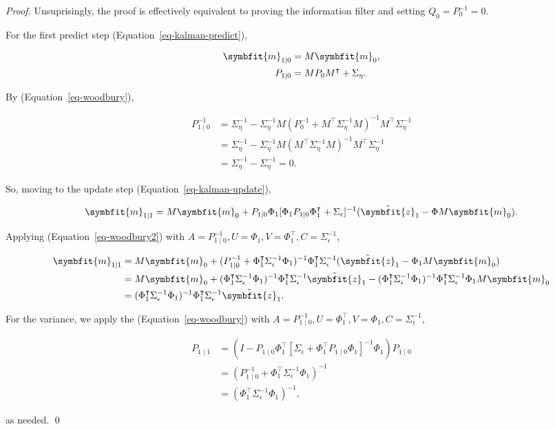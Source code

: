 \documentclass[
]{report}
\newcommand{\bv}[1]{\symbfit{#1}}
\theoremstyle{plain}
\theoremstyle{plain}
\theoremstyle{plain}
\theoremstyle{remark}
\begin{document}
\begin{proof}
Unsuprisingly, the proof is effectively equivalent to proving the
information filter and setting \(Q_0 = P_0^{-1}=0\).

For the first predict step (Equation~\ref{eq-kalman-predict}),

\[\begin{split}
  \bv m_{1\mid0} &= M \bv m_0,\\
  P_{1\mid0} &= M P_0 M^\intercal + \Sigma_\eta.
\end{split}
\]

By (Equation~\ref{eq-woodbury}),

\[\begin{split}
  P_{1\mid0}^{-1} &= \Sigma_\eta^{-1} - \Sigma_\eta^{-1} M (P_0^{-1} + M^\intercal \Sigma_\eta^{-1} M)^{-1}M^\intercal\Sigma_\eta^{-1}\\
  &= \Sigma_\eta^{-1} - \Sigma_\eta^{-1} M (M^\intercal \Sigma_\eta^{-1} M)^{-1}M^\intercal\Sigma_\eta^{-1}\\
  &= \Sigma_\eta^{-1} - \Sigma_\eta^{-1} = 0.
\end{split}
\]

So, moving to the update step (Equation~\ref{eq-kalman-update}),

\[\begin{split}
  \bv m_{1\mid1} = M \bv m_0 + P_{1\mid0}\Phi_1 [\Phi_1 P_{1\mid0} \Phi_1^\intercal + \Sigma_\epsilon]^{-1}(\tilde{\bv{z}}_1 - \Phi M \bv m_0).\\
\end{split}
\]

Applying (Equation~\ref{eq-woodbury2}) with
\(A = P_{1\mid0}^{-1}, U=\Phi_1, V=\Phi_1^\intercal, C=\Sigma_\epsilon^{-1}\),

\[\begin{split}
  \bv m_{1\mid1} &= M \bv m_0 + (P_{1\mid0}^{-1} + \Phi_1^\intercal\Sigma_\epsilon^{-1} \Phi_1)^{-1}\Phi_1^\intercal \Sigma_\epsilon^{-1}(\tilde{\bv{z}}_1 - \Phi_1 M\bv m_0)\\
  &= M \bv m_0 + (\Phi_1^\intercal\Sigma_\epsilon^{-1}\Phi_1)^{-1}\Phi_1^\intercal\Sigma_\epsilon^{-1} \tilde{\bv{z}}_1 - (\Phi_1^\intercal\Sigma_\epsilon^{-1}\Phi_1)^{-1}\Phi_1^\intercal\Sigma_\epsilon^{-1}\Phi_1M\bv m_0\\
  &= (\Phi_1^\intercal\Sigma_\epsilon^{-1}\Phi_1)^{-1}\Phi_1^\intercal\Sigma_\epsilon^{-1} \tilde{\bv{z}}_1.
\end{split}
\]

For the variance, we apply the (Equation~\ref{eq-woodbury}) with
\(A = P_{1\mid0}^{-1}, U=\Phi_1^\intercal, V=\Phi_1, C=\Sigma_\epsilon^{-1}\),

\[\begin{split}
  P_{1\mid1} &= (I - P_{1\mid0}\Phi_1^\intercal[\Sigma_\epsilon + \Phi_1^\intercal P_{1\mid0}\Phi_1]^{-1}\Phi_1)P_{1\mid0}\\
  &= (P_{1\mid0}^{-1} + \Phi_1^\intercal \Sigma_\epsilon^{-1}\Phi_1)^{-1}\\
  &= (\Phi_1^\intercal \Sigma_\epsilon^{-1}\Phi_1)^{-1},
\end{split}
\]

as needed. \qed
\end{proof}
\end{document}
